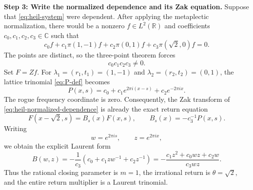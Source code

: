 \documentclass[reqno]{amsart}
\theoremstyle{remark}
\numberwithin{equation}{section}
\newcommand{\R}{\mathbb{R}}
\newcommand{\C}{\mathbb{C}}
\begin{document}
\smallskip
\noindent
\textbf{Step 3: Write the normalized dependence and its Zak equation.}
Suppose that \eqref{eq:heil-system} were dependent. After applying the
metaplectic normalization, there would be a nonzero \(f\in L^2(\R)\) and
coefficients \(c_0,c_1,c_2,c_3\in\C\) such that
\begin{equation}
  c_0f+c_1\pi(1,-1)f+c_2\pi(0,1)f
  +c_3\pi(\sqrt2,0)f=0.
  \label{eq:heil-normalized-dependence}
\end{equation}
The points are distinct, so the three-point theorem forces
\begin{equation}
  c_0c_1c_2c_3\neq0.
  \label{eq:heil-coefficients-nonzero}
\end{equation}
Set \(F=Zf\). For \(\lambda_1=(r_1,t_1)=(1,-1)\) and
\(\lambda_2=(r_2,t_2)=(0,1)\), the lattice trinomial
\eqref{eq:P-def} becomes
\begin{equation}
  P(x,s)
  =c_0+c_1e^{2\pi i(x-s)}+c_2e^{-2\pi ix}.
  \label{eq:heil-P}
\end{equation}
The rogue frequency coordinate is zero. Consequently, the Zak transform of
\eqref{eq:heil-normalized-dependence} is already the exact return equation
\begin{equation}
  F(x-\sqrt2,s)=B_s(x)F(x,s),
  \qquad
  B_s(x)=-c_3^{-1}P(x,s).
  \label{eq:heil-return}
\end{equation}
Writing
\[
  w=e^{2\pi is},\qquad z=e^{2\pi ix},
\]
we obtain the explicit Laurent form
\begin{equation}
  B(w,z)
  =-\frac1{c_3}
    \left(c_0+c_1zw^{-1}+c_2z^{-1}\right)
  =-\frac{c_1z^2+c_0wz+c_2w}{c_3wz}.
  \label{eq:heil-Laurent-return}
\end{equation}
Thus the rational closing parameter is \(m=1\), the irrational return is
\(\theta=\sqrt2\), and the entire return multiplier is a Laurent trinomial.
\end{document}

